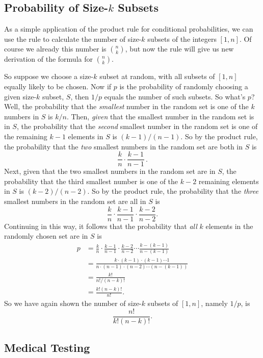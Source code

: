 \subsection{Probability of Size-$k$ Subsets}
As a simple application of the product rule for conditional
probabilities, we can use the rule to calculate the number of size-$k$
subsets of the integers $[1,n]$.  Of course we already this number
is $\binom{n}{k}$, but now the rule will give us new derivation of
the formula for $\binom{n}{k}$.

So suppose we choose a size-$k$ subset at random, with all subsets of
$[1,n]$ equally likely to be chosen.  Now if $p$ is the probability of
randomly choosing a given size-$k$ subset, $S$, then $1/p$ equals the number of
such subsets.  So what's $p$?  Well, the probability
that the \emph{smallest} number in the random set is one of the $k$
numbers in $S$ is $k/n$.  Then, \emph{given} that the smallest number
in the random set is in $S$, the probability that the \emph{second}
smallest number in the random set is one of the remaining $k-1$
elements in $S$ is $(k-1)/(n-1)$.  So by the product rule, the
probability that the \emph{two} smallest numbers in the random set are
both in $S$ is
\[
\frac{k}{n} \cdot \frac{k-1}{n-1}\, .
\]
Next, given that the two smallest numbers in the random set are in
$S$, the probability that the third smallest number is one of the
$k-2$ remaining elements in $S$ is $(k-2)/(n-2)$.  So by the product
rule, the probability that the \emph{three} smallest numbers in the
random set are all in $S$ is
\[
\frac{k}{n} \cdot \frac{k-1}{n-1} \cdot \frac{k-2}{n-2}.
\]
Continuing in this way, it follows that the probability that
\emph{all} $k$ elements in the randomly chosen set are in $S$ is
\begin{align*}
p & = \frac{k}{n} \cdot \frac{k-1}{n-1} \cdot \frac{k-2}{n-2}
              \cdots \frac{k-(k-1)}{n-(k-1)}\\
  & = \frac{k \cdot (k-1) \cdot (k-1) \cdots 1}%
           {n \cdot (n-1) \cdot (n-2) \cdots (n-(k-1))}\\
  & = \frac{k!}{n!/(n-k)!}\\
  & = \frac{k!(n-k)!}{n!}.
\end{align*}
So we have again shown the number of size-$k$ subsets of $[1,n]$,
namely $1/p$, is
\[
\frac{n!}{k!(n-k)!}.
\]


\subsection{Medical Testing}\label{med_test-subsection}

